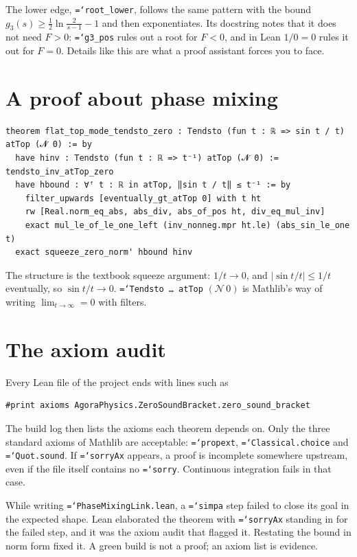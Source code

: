 \documentclass[11pt,a4paper,openany]{book}
\newcommand{\code}[1]{\texttt{\hyphenchar\font=`\-\relax #1}}
\theoremstyle{definition}
\theoremstyle{plain}
\begin{document}
The lower edge, \code{root\_lower}, follows the same pattern with the bound
$g_3(s)\ge\frac12\ln\frac2{s-1}-1$ and then exponentiates. Its docstring notes that it does not
need $F>0$: \code{g3\_pos} rules out a root for $F<0$, and in Lean $1/0=0$ rules it out for $F=0$.
Details like this are what a proof assistant forces you to face.

\section{A proof about phase mixing}

\begin{lstlisting}
theorem flat_top_mode_tendsto_zero : Tendsto (fun t : ℝ => sin t / t) atTop (𝓝 0) := by
  have hinv : Tendsto (fun t : ℝ => t⁻¹) atTop (𝓝 0) := tendsto_inv_atTop_zero
  have hbound : ∀ᶠ t : ℝ in atTop, ‖sin t / t‖ ≤ t⁻¹ := by
    filter_upwards [eventually_gt_atTop 0] with t ht
    rw [Real.norm_eq_abs, abs_div, abs_of_pos ht, div_eq_mul_inv]
    exact mul_le_of_le_one_left (inv_nonneg.mpr ht.le) (abs_sin_le_one t)
  exact squeeze_zero_norm' hbound hinv
\end{lstlisting}
The structure is the textbook squeeze argument: $1/t\to0$, and $|\sin t/t|\le1/t$ eventually, so
$\sin t/t\to0$. \code{Tendsto \dots\ atTop} $(\mathcal{N}\,0)$ is Mathlib's way of writing
$\lim_{t\to\infty}=0$ with filters.

\section{The axiom audit}

Every Lean file of the project ends with lines such as
\begin{lstlisting}
#print axioms AgoraPhysics.ZeroSoundBracket.zero_sound_bracket
\end{lstlisting}
The build log then lists the axioms each theorem depends on. Only the three standard axioms of
Mathlib are acceptable: \code{propext}, \code{Classical.choice} and \code{Quot.sound}. If
\code{sorryAx} appears, a proof is incomplete somewhere upstream, even if the file itself contains
no \code{sorry}. Continuous integration fails in that case.

\begin{lesson}
While writing \code{PhaseMixingLink.lean}, a \code{simpa} step failed to close its goal in the
expected shape. Lean elaborated the theorem with \code{sorryAx} standing in for the failed step,
and it was the axiom audit that flagged it. Restating the bound in norm form fixed it. A green build is not a proof;
an axiom list is evidence.
\end{lesson}
\end{document}

